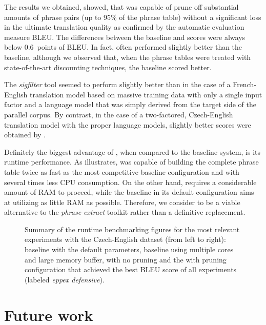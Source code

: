 The results we obtained, showed, that \eppex{} was capable of prune off
substantial amounts of phrase pairs (up to 95\% of the phrase table) without
a significant loss in the ultimate translation quality as confirmed by the
automatic evaluation measure BLEU.
The differences between the baseline and \eppex{} scores were always below
0.6~points of BLEU.
In fact, \eppex{} often performed slightly better than the baseline,
although we observed that, when the phrase tables were treated with
state-of-the-art discounting techniques, the baseline scored better.

The \emph{sigfilter} tool seemed to perform slightly better than \eppex{}
in the case of a French-English translation model based on massive training
data with only a single input factor and a language model that was simply
derived from the target side of the parallel corpus.
By contrast, in the case of a two-factored, Czech-English translation model with
the proper language models, slightly better scores were obtained by \eppex{}.

Definitely the biggest advantage of \eppex{}, when compared to the baseline
system, is its runtime performance.
As  illustrates, \eppex{} was capable of building
the complete phrase table twice as fast as the most competitive baseline
configuration and with several times less CPU consumption.
On the other hand, \eppex{} requires a considerable amount of RAM to proceed,
while the baseline in its default configuration aims at utilizing as little RAM
as possible.
Therefore, we consider \eppex{} to be a viable alternative to the \emph{phrase-extract}
toolkit rather than a definitive replacement.

\begin{figure}[!htb]
  \centering
  
  \caption{
    Summary of the runtime benchmarking figures for the most relevant experiments
    with the Czech-English dataset (from left to right): baseline with the default
    parameters, baseline using multiple cores and large memory buffer, \eppex{}
    with no pruning and the \eppex{} with pruning configuration that achieved the best
    BLEU score of all experiments (labeled \emph{eppex defensive}).
  }
  \label{fig:conclusions-cs-en}
\end{figure}

\section{Future work}

